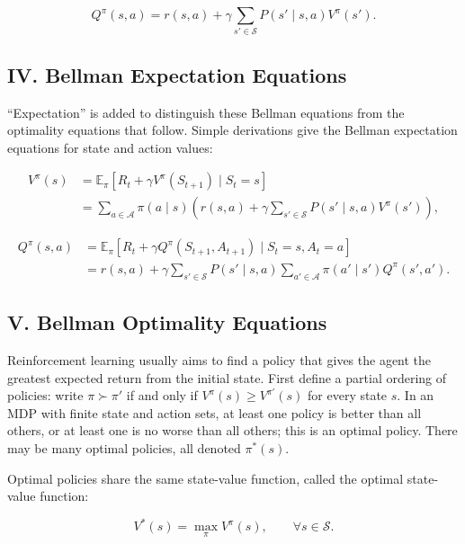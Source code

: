 \[
Q^{\pi}(s,a)=r(s,a)+\gamma\sum_{s'\in\mathcal{S}}P(s'\mid s,a)V^{\pi}(s').
\]

\hypertarget{iv.-bellman-expectation-equations}{%
\subsection{IV. Bellman Expectation Equations}\label{iv.-bellman-expectation-equations}}

``Expectation'' is added to distinguish these Bellman equations from the optimality equations that follow. Simple derivations give the Bellman expectation equations for state and action values:

\[
\begin{aligned}
V^{\pi}(s)
&=\mathbb{E}_{\pi}[R_t+\gamma V^{\pi}(S_{t+1})\mid S_t=s]\\
&=\sum_{a\in\mathcal{A}}\pi(a\mid s)
(r(s,a)+\gamma\sum_{s'\in\mathcal{S}}P(s'\mid s,a)V^{\pi}(s')),
\end{aligned}
\]

\[
\begin{aligned}
Q^{\pi}(s,a)
&=\mathbb{E}_{\pi}[R_t+\gamma Q^{\pi}(S_{t+1},A_{t+1})\mid S_t=s,A_t=a]\\
&=r(s,a)+\gamma\sum_{s'\in\mathcal{S}}P(s'\mid s,a)
\sum_{a'\in\mathcal{A}}\pi(a'\mid s')Q^{\pi}(s',a').
\end{aligned}
\]

\hypertarget{v.-bellman-optimality-equations}{%
\subsection{V. Bellman Optimality Equations}\label{v.-bellman-optimality-equations}}

Reinforcement learning usually aims to find a policy that gives the agent the greatest expected return from the initial state. First define a partial ordering of policies: write \(\pi\succ \pi'\) if and only if \(V^{\pi}(s)\ge V^{\pi'}(s)\) for every state \(s\). In an MDP with finite state and action sets, at least one policy is better than all others, or at least one is no worse than all others; this is an optimal policy. There may be many optimal policies, all denoted \(\pi^{*}(s)\).

Optimal policies share the same state-value function, called the optimal state-value function:

\[
V^{*}(s)=\max_{\pi}V^{\pi}(s),\qquad \forall s\in\mathcal{S}.
\]


